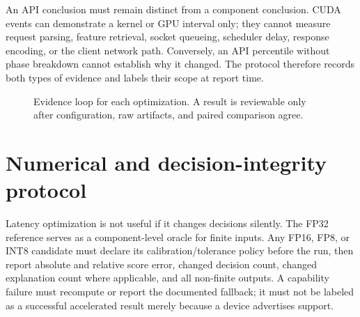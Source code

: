 \documentclass[10pt,a4paper,twocolumn]{article}
\begin{document}
An API conclusion must remain distinct from a component conclusion. CUDA events
can demonstrate a kernel or GPU interval only; they cannot measure request
parsing, feature retrieval, socket queueing, scheduler delay, response encoding,
or the client network path. Conversely, an API percentile without phase
breakdown cannot establish why it changed. The protocol therefore records both
types of evidence and labels their scope at report time.

\begin{figure}[b]\centering
{}
\caption{Evidence loop for each optimization. A result is reviewable only after configuration, raw artifacts, and paired comparison agree.}
\end{figure}

\clearpage
\section{Numerical and decision-integrity protocol}
Latency optimization is not useful if it changes decisions silently. The FP32
reference serves as a component-level oracle for finite inputs. Any FP16, FP8,
or INT8 candidate must declare its calibration/tolerance policy before the run,
then report absolute and relative score error, changed decision count, changed
explanation count where applicable, and all non-finite outputs. A capability
failure must recompute or report the documented fallback; it must not be labeled
as a successful accelerated result merely because a device advertises support.
\end{document}

